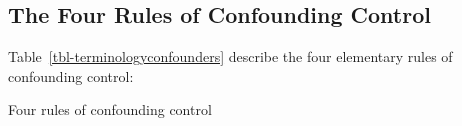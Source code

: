 \documentclass[
  single column]{article}
\begin{document}
\newpage{}

\subsection{The Four Rules of Confounding
Control}\label{the-four-rules-of-confounding-control}

Table~\ref{tbl-terminologyconfounders} describe the four elementary
rules of confounding control:

\begin{table}

\caption{\label{tbl-terminologyconfounders}Four rules of confounding
control}

\centering{

\terminologyelconfounders

}

\end{table}%
\end{document}
